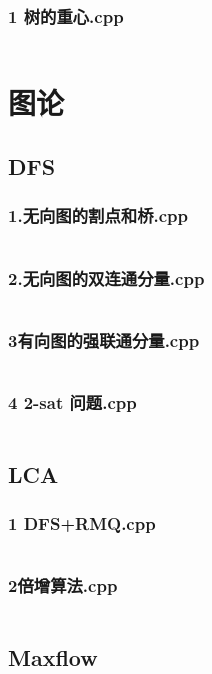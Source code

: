 \documentclass[a4paper,11pt]{article}
\begin{document}
\subsubsection{1 树的重心.cpp}
\inputminted[breaklines]{c++}{"D:/tmplz/templates/动态规划/树上的分治/1 树的重心.cpp"}
\section{图论}
\subsection{DFS}
\subsubsection{1.无向图的割点和桥.cpp}
\inputminted[breaklines]{c++}{"D:/tmplz/templates/图论/DFS/1.无向图的割点和桥.cpp"}
\subsubsection{2.无向图的双连通分量.cpp}
\inputminted[breaklines]{c++}{"D:/tmplz/templates/图论/DFS/2.无向图的双连通分量.cpp"}
\subsubsection{3有向图的强联通分量.cpp}
\inputminted[breaklines]{c++}{"D:/tmplz/templates/图论/DFS/3有向图的强联通分量.cpp"}
\subsubsection{4 2-sat 问题.cpp}
\inputminted[breaklines]{c++}{"D:/tmplz/templates/图论/DFS/4 2-sat 问题.cpp"}
\subsection{LCA}
\subsubsection{1 DFS+RMQ.cpp}
\inputminted[breaklines]{c++}{"D:/tmplz/templates/图论/LCA/1 DFS+RMQ.cpp"}
\subsubsection{2倍增算法.cpp}
\inputminted[breaklines]{c++}{"D:/tmplz/templates/图论/LCA/2倍增算法.cpp"}
\subsection{Maxflow}
\end{document}
